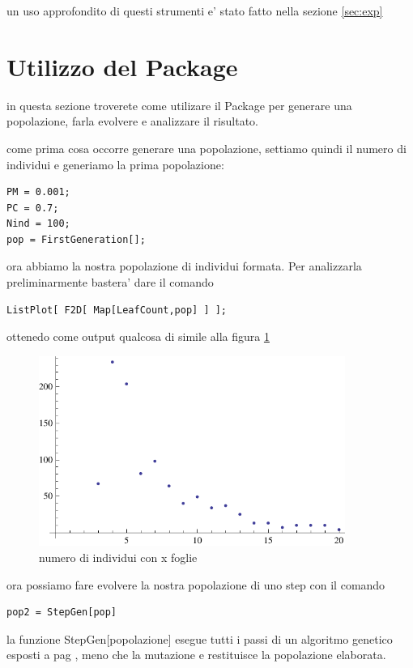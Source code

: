 \documentclass[12pt, a4paper]{article}
\begin{document}
un uso approfondito di questi strumenti e' stato fatto nella sezione \ref{sec:exp}

\section{Utilizzo del Package}
in questa sezione troverete come utilizare il Package per generare una popolazione, farla evolvere e analizzare il risultato.

come prima cosa occorre generare una popolazione, settiamo quindi il numero di individui e generiamo la prima popolazione:
\begin{lstlisting}
PM = 0.001;
PC = 0.7;
Nind = 100;
pop = FirstGeneration[];
\end{lstlisting}

ora abbiamo la nostra popolazione di individui formata. Per analizzarla preliminarmente bastera' dare il comando
\lstset{caption=,label=}
\begin{lstlisting}
ListPlot[ F2D[ Map[LeafCount,pop] ] ];
\end{lstlisting}

ottenedo come output qualcosa di simile alla figura \ref{figure:leafcount}

\begin{figure}[!h]
\begin{center}
\includegraphics[width=10.0cm]{leafcountlistplot.pdf}
\caption{numero di individui con x foglie}
\label{figure:leafcount}
\end{center}
\end{figure}

ora possiamo fare evolvere la nostra popolazione di uno step con il comando
\begin{lstlisting}
pop2 = StepGen[pop]
\end{lstlisting}
la funzione StepGen[popolazione] esegue tutti i passi di un algoritmo genetico esposti a pag \pageref{sec:intro}, meno che la mutazione e restituisce la popolazione elaborata.
\end{document}
